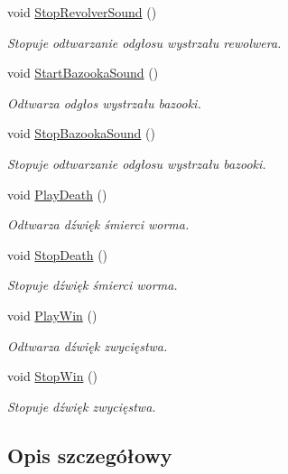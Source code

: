 \begin{DoxyCompactItemize}
void \mbox{\hyperlink{class_game_sound_a88651691b6b8e28f14e73778805bd898}{Stop\+Revolver\+Sound}} ()
\begin{DoxyCompactList}\small\item\em Stopuje odtwarzanie odgłosu wystrzału rewolwera. \end{DoxyCompactList}\item 
void \mbox{\hyperlink{class_game_sound_ab3bc96f5be15c7a9be79a035ec16638c}{Start\+Bazooka\+Sound}} ()
\begin{DoxyCompactList}\small\item\em Odtwarza odgłos wystrzału bazooki. \end{DoxyCompactList}\item 
void \mbox{\hyperlink{class_game_sound_a90742af83bd0006dba5e9a5129214c9a}{Stop\+Bazooka\+Sound}} ()
\begin{DoxyCompactList}\small\item\em Stopuje odtwarzanie odgłosu wystrzału bazooki. \end{DoxyCompactList}\item 
void \mbox{\hyperlink{class_game_sound_acd0ef105f4731da50afe47b3e02558a2}{Play\+Death}} ()
\begin{DoxyCompactList}\small\item\em Odtwarza dźwięk śmierci worma. \end{DoxyCompactList}\item 
void \mbox{\hyperlink{class_game_sound_accb7034b9c796bc9270fc3a724d18821}{Stop\+Death}} ()
\begin{DoxyCompactList}\small\item\em Stopuje dźwięk śmierci worma. \end{DoxyCompactList}\item 
void \mbox{\hyperlink{class_game_sound_a429befa039bfc4e9f7b33326fbb090a4}{Play\+Win}} ()
\begin{DoxyCompactList}\small\item\em Odtwarza dźwięk zwycięstwa. \end{DoxyCompactList}\item 
void \mbox{\hyperlink{class_game_sound_a1001607a8791e3000aff36fcc2d949f3}{Stop\+Win}} ()
\begin{DoxyCompactList}\small\item\em Stopuje dźwięk zwycięstwa. \end{DoxyCompactList}\end{DoxyCompactItemize}


\subsection{Opis szczegółowy}


